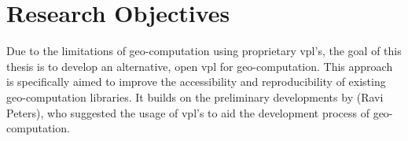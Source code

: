 





\section{Research Objectives}
Due to the limitations of geo-computation using proprietary vpl's, the goal of this thesis is to develop an alternative, open vpl for geo-computation. This approach is specifically aimed to improve the accessibility and reproducibility of existing geo-computation libraries. It builds on the preliminary developments by (Ravi Peters), who suggested the usage of vpl's to aid the development process of geo-computation. 







